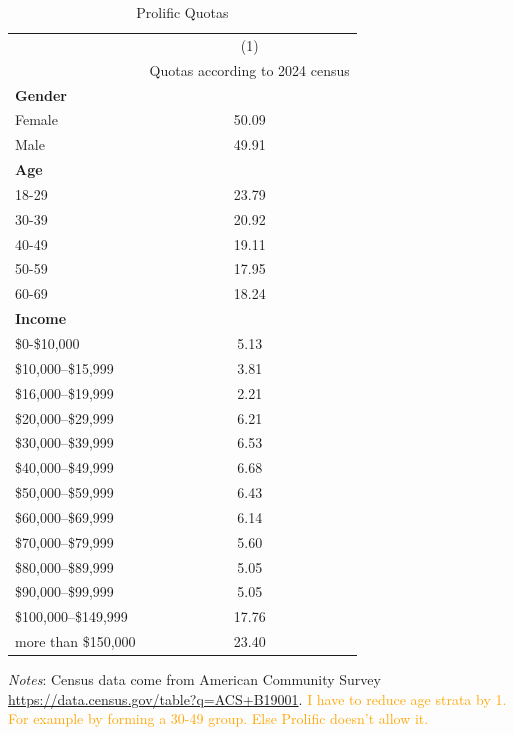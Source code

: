 \documentclass[11pt]{article}
\newcommand{\tk}[1]{\textcolor{orange}{#1}}
\begin{document}
\begin{table}[!htbp]\centering
\caption{Prolific Quotas}
\label{tab:prolificquotas}
\begin{threeparttable}
\begin{tabular}{lc}
\toprule
& (1) \\
& Quotas according to 2024 census  \\

\midrule
\textbf{Gender} \\
Female                  & 50.09 \\
Male                    & 49.91 \\[0.5em]
\textbf{Age} \\
18-29                  & 23.79 \\
30-39                  & 20.92 \\
40-49                  & 19.11 \\
50-59                  & 17.95 \\
60-69                  & 18.24 \\[0.5em]
\textbf{Income}\\
\$0-\$10,000        & 5.13 \\
\$10,000–\$15,999   & 3.81 \\
\$16,000–\$19,999   & 2.21 \\
\$20,000–\$29,999   & 6.21 \\
\$30,000–\$39,999   & 6.53 \\
\$40,000–\$49,999   & 6.68 \\
\$50,000–\$59,999   & 6.43 \\
\$60,000–\$69,999   & 6.14 \\
\$70,000–\$79,999   & 5.60 \\
\$80,000–\$89,999   & 5.05 \\
\$90,000–\$99,999   & 5.05 \\
\$100,000–\$149,999 & 17.76\\
more than \$150,000 & 23.40 \\
\bottomrule
\end{tabular}
\begin{tablenotes}[flushleft]
\footnotesize
\item \textit{Notes}: Census data come from American Community Survey \url{https://data.census.gov/table?q=ACS+B19001}.  \tk{I have to reduce age strata by 1. For example by forming a 30-49 group. Else Prolific doesn't allow it. }
\end{tablenotes}
\end{threeparttable}
\end{table}
\end{document}

